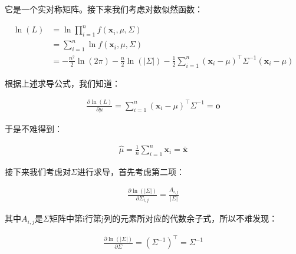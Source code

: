 \documentclass[UTF8]{book}
\begin{document}
它是一个实对称矩阵。接下来我们考虑对数似然函数：
\begin{large}
    \begin{equation}
        \begin{aligned}
            \ln(L) &= \ln \prod_{i=1}^{n} f(\mathbf{x}_i,\mu, \Sigma) \\
            &= \sum_{i=1}^{n} \ln f(\mathbf{x}_i, \mu, \Sigma) \\
            &= -\frac{n^2}{2}\ln (2\pi) - \frac{n}{2} \ln (\left| \Sigma \right|) - \frac{1}{2}\sum_{i=1}^{n}(\mathbf{x}_i-\mu)^\top\Sigma^{-1}(\mathbf{x}_i-\mu)
            \nonumber
        \end{aligned}
    \end{equation}
\end{large}
根据上述求导公式，我们知道：
\begin{large}
    \begin{equation}
        \begin{aligned}
            \frac{\partial \ln(L)}{\partial \mu} = \sum_{i=1}^{n} (\mathbf{x}_i-\mu)^\top \Sigma^{-1}=\mathbf{o}
            \nonumber
        \end{aligned}
    \end{equation}
\end{large}
于是不难得到：
\begin{large}
    \begin{equation}
        \begin{aligned}
            \hat{\mu}=\frac{1}{n}\sum_{i=1}^{n}\mathbf{x}_i=\bar{\mathbf{x}}
            \nonumber
        \end{aligned}
    \end{equation}
\end{large}
接下来我们考虑对$\Sigma$进行求导，首先考虑第二项：
\begin{large}
    \begin{equation}
        \begin{aligned}
            \frac{\partial \ln (\left| \Sigma \right|)}{\partial \Sigma_{i,j}}=\frac{A_{i,j}}{\left| \Sigma \right|}
            \nonumber
        \end{aligned}
    \end{equation}
\end{large}
其中$A_{i,j}$是$\Sigma$矩阵中第i行第j列的元素所对应的代数余子式，所以不难发现：
\begin{large}
    \begin{equation}
        \begin{aligned}
            \frac{\partial \ln (\left| \Sigma \right|)}{\partial \Sigma} = (\Sigma^{-1})^\top = \Sigma^{-1}
            \nonumber
        \end{aligned}
    \end{equation}
\end{large}
\end{document}
